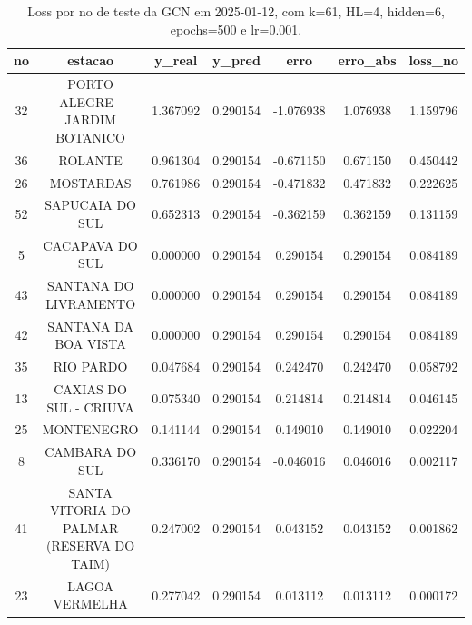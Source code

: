 \begin{table}[h]
\centering
\caption{Loss por no de teste da GCN em 2025-01-12, com k=61, HL=4, hidden=6, epochs=500 e lr=0.001.}
\label{tab:gcn_loss_k61_hl4_h6_e500_d20250112}
\begin{tabular}{ccccccc}
\toprule
no & estacao & y\_real & y\_pred & erro & erro\_abs & loss\_no \\
\midrule
32 & PORTO ALEGRE - JARDIM BOTANICO & 1.367092 & 0.290154 & -1.076938 & 1.076938 & 1.159796 \\
36 & ROLANTE & 0.961304 & 0.290154 & -0.671150 & 0.671150 & 0.450442 \\
26 & MOSTARDAS & 0.761986 & 0.290154 & -0.471832 & 0.471832 & 0.222625 \\
52 & SAPUCAIA DO SUL & 0.652313 & 0.290154 & -0.362159 & 0.362159 & 0.131159 \\
5 & CACAPAVA DO SUL & 0.000000 & 0.290154 & 0.290154 & 0.290154 & 0.084189 \\
43 & SANTANA DO LIVRAMENTO & 0.000000 & 0.290154 & 0.290154 & 0.290154 & 0.084189 \\
42 & SANTANA DA BOA VISTA & 0.000000 & 0.290154 & 0.290154 & 0.290154 & 0.084189 \\
35 & RIO PARDO & 0.047684 & 0.290154 & 0.242470 & 0.242470 & 0.058792 \\
13 & CAXIAS DO SUL - CRIUVA & 0.075340 & 0.290154 & 0.214814 & 0.214814 & 0.046145 \\
25 & MONTENEGRO & 0.141144 & 0.290154 & 0.149010 & 0.149010 & 0.022204 \\
8 & CAMBARA DO SUL & 0.336170 & 0.290154 & -0.046016 & 0.046016 & 0.002117 \\
41 & SANTA VITORIA DO PALMAR (RESERVA DO TAIM) & 0.247002 & 0.290154 & 0.043152 & 0.043152 & 0.001862 \\
23 & LAGOA VERMELHA & 0.277042 & 0.290154 & 0.013112 & 0.013112 & 0.000172 \\
\bottomrule
\end{tabular}
\end{table}

